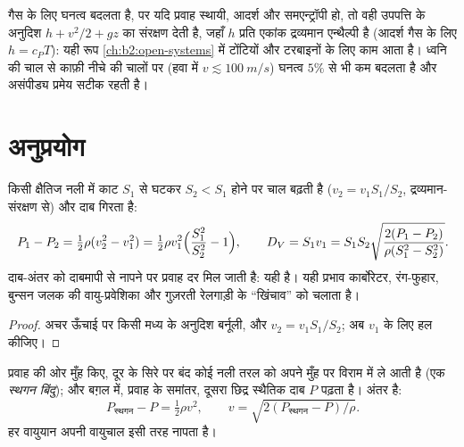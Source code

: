 \begin{remark}[संपीड्य तरल]\label{rem:b2:euler-bernoulli:compressible}
गैस के लिए घनत्व बदलता है, पर यदि प्रवाह स्थायी, आदर्श और
समएन्ट्रॉपी हो, तो वही उपपत्ति  के अनुदिश $h + v^2/2 + gz$ का
संरक्षण देती है, जहाँ $h$ प्रति एकांक द्रव्यमान एन्थैल्पी है (आदर्श गैस
के लिए $h = c_PT$): यही रूप \cref{ch:b2:open-systems} में टोंटियों और
टरबाइनों के लिए काम आता है। ध्वनि की चाल से काफ़ी नीचे की चालों पर
(हवा में $v \lesssim \qty{100}{m/s}$) घनत्व $5\%$ से भी कम बदलता है
और असंपीड्य प्रमेय सटीक रहती है।
\end{remark}

\section{अनुप्रयोग}

\begin{proposition}[वेंचुरी मापी]\label{prop:b2:euler-bernoulli:venturi}
किसी क्षैतिज नली में काट $S_1$ से घटकर $S_2 < S_1$ होने पर
चाल बढ़ती है ($v_2 = v_1S_1/S_2$, द्रव्यमान-संरक्षण से) और दाब
गिरता है:
\[
P_1 - P_2 = \tfrac12\rho(v_2^2 - v_1^2) = \tfrac12\rho v_1^2\Bigl(\frac{S_1^2}{S_2^2} - 1\Bigr) ,
\qquad
D_V = S_1v_1 = S_1S_2\sqrt{\frac{2(P_1 - P_2)}{\rho(S_1^2 - S_2^2)}} .
\]
दाब-अंतर को दाबमापी से नापने पर प्रवाह दर मिल जाती है: यही
\emph{} है। यही प्रभाव कार्बोरेटर, रंग-फुहार, बुन्सन जलक
की वायु-प्रवेशिका और गुज़रती रेलगाड़ी के ``खिंचाव'' को चलाता है।
\end{proposition}

\begin{proof}
अचर ऊँचाई पर किसी मध्य  के अनुदिश बर्नूली, और $v_2 =
v_1S_1/S_2$; अब $v_1$ के लिए हल कीजिए।
\end{proof}

\begin{proposition}[पीटो नली]\label{prop:b2:euler-bernoulli:pitot}
प्रवाह की ओर मुँह किए, दूर के सिरे पर बंद कोई नली तरल को अपने मुँह पर
विराम में ले आती है (एक \emph{स्थगन बिंदु}); और बग़ल में, प्रवाह के
समांतर, दूसरा छिद्र स्थैतिक दाब $P$ पढ़ता है। अंतर
 है:
\[
P_{\text{स्थगन}} - P = \tfrac12\rho v^2 , \qquad v = \sqrt{2(P_{\text{स्थगन}} - P)/\rho} .
\]
हर वायुयान अपनी वायुचाल इसी तरह नापता है।
\end{proposition}

